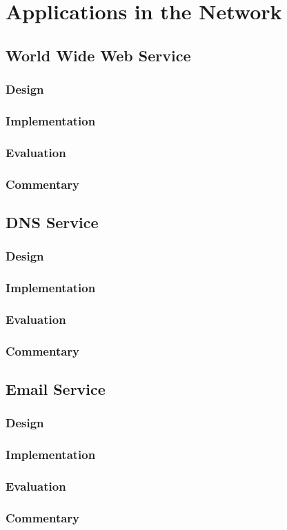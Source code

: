 \chapter{Applications in the Network}
\label{chap:applications}

\section{World Wide Web Service}

\subsection{Design}

\subsection{Implementation}

\subsection{Evaluation}

\subsection{Commentary}



\section{DNS Service}

\subsection{Design}

\subsection{Implementation}

\subsection{Evaluation}

\subsection{Commentary}


\section{Email Service}

\subsection{Design}

\subsection{Implementation}

\subsection{Evaluation}

\subsection{Commentary}
